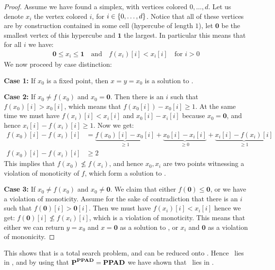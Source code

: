 \begin{proof}
    Assume we have found a simplex, with vertices colored $0, \dots, d$. Let us denote $x_i$ the vertex colored $i$, for $i \in \left\{0, \dots, d\right\}$. Notice that all of these vertices are by construction contained in some cell (hypercube of length $1$), let $\mathbf{0}$ be the smallest vertex of this hypercube and $\mathbf{1}$ the largest. In particular this means that for all $i$ we have:
    \begin{align*}
        \mathbf{0} \leq x_i \leq \mathbf{1} \quad \text{and} \quad f(x_i)[i] < x_i[i] \quad \text{for $i > 0$}
    \end{align*}
    We now proceed by case distinction:

    \textbf{Case 1:} If $x_0$ is a fixed point, then $x = y = x_0$ is a solution to \Tarskistar.

    \textbf{Case 2:} If $x_0 \neq f(x_0)$ and $x_0 = \mathbf{0}$. Then there is an $i$ such that $f(x_0)[i] > x_0[i]$, which means that $f(x_0[i]) - x_0[i] \geq 1$. At the same time we must have $f(x_i)[i] < x_i[i]$ and $x_0[i] - x_i[i]$ because $x_0 = \mathbf{0}$, and hence $x_i[i] - f(x_i)[i] \geq 1$. Now we get:
    \begin{align*}
        f(x_0)[i] - f(x_i)[i] & = \underbrace{f(x_0)[i] - x_0[i]}_{\geq 1} + \underbrace{x_0[i] - x_i[i]}_{\geq 0} + \underbrace{x_i[i] - f(x_i)[i]}_{\geq 1} \\
        f(x_0)[i] - f(x_i)[i] & \geq 2
    \end{align*}
    This implies that $f(x_0) \not \leq f(x_i)$, and hence $x_0, x_i$ are two points witnessing a violation of monoticity of $f$, which form a solution to \Tarskistar.

    \textbf{Case 3:} If $x_0 \neq f(x_0)$ and $x_0 \neq \mathbf{0}$. We claim that either $f(\mathbf{0}) \leq \mathbf{0}$, or we have a violation of monoticity. Assume for the sake of contradiction that there is an $i$ such that $f(\mathbf{0})[i] > \mathbf{0}[i]$. Then we must have $f(x_i)[i] < x_i[i]$ hence we get: $f(\mathbf{0})[i] \not\leq f(x_i)[i]$, which is a violation of monoticity. This means that either we can return $y = x_0$ and $x = \mathbf{0}$ as a solution to \Tarskistar, or $x_i$ and $\mathbf{0}$ as a violation of mononicity.
\end{proof}
This shows that \Tarskistar is a total search problem, and can be reduced onto \Sperner. Hence \Tarskistar\ lies in \PPAD, and by using that $\textbf{P}^{\textbf{PPAD}} = \textbf{PPAD}$ we have shown that \Tarski\ lies in \PPAD.
